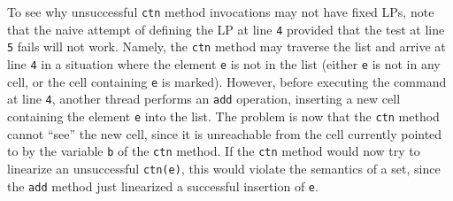 To see why unsuccessful {\tt ctn} method invocations may not have fixed LPs,
note that the naive attempt of defining the LP at line {\tt 4}
provided  that the test at line {\tt 5} fails will not work. Namely, the
{\tt ctn} method may traverse the list and arrive at line {\tt 4} in
a situation where the element {\tt e} is not in the list (either {\tt e} is
not in any cell, or the cell containing {\tt e} is marked). However, before
executing the command at line {\tt 4}, another thread performs an {\tt add}
operation, inserting a new cell containing the element {\tt e} into the list.
The problem is now that
the {\tt ctn} method cannot ``see'' the new cell, since it is unreachable from
the cell currently pointed to by the variable {\tt b} of the
{\tt ctn} method. If the {\tt ctn}
method would now try to linearize an unsuccessful {\tt ctn(e)}, this would
violate the semantics of a set, since the {\tt add} method just linearized
a successful insertion of {\tt e}.
%
%
